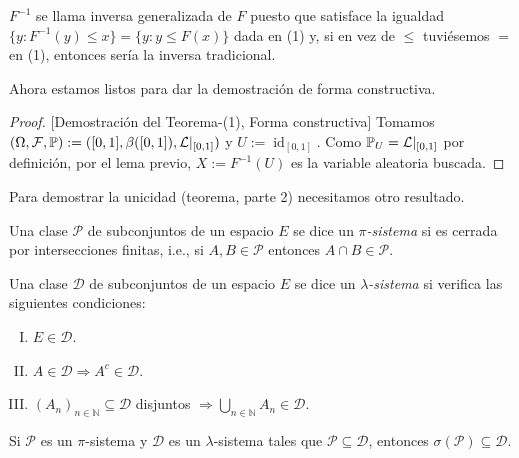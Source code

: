 \begin{remark}
	\(F^{-1}\) se llama inversa generalizada de \(F\) puesto que satisface la igualdad \(\{y : F^{-1}(y) \le x\} = \{y : y \le F(x)\}\) dada en (1) y, si en vez de \(\le\) tuviésemos \(=\) en (1), entonces sería la inversa tradicional.
\end{remark}

Ahora estamos listos para dar la demostración de forma constructiva.

\begin{proof}[Proof][Demostración del Teorema-(1), Forma constructiva]
	Tomamos \((\Omega, \mathcal{F}, \mathbb{P}) := ([0,1], \beta([0,1]), \mathcal{L}|_{[0,1]})\) y \(U := \operatorname{id}_{[0,1]}\). Como \(\mathbb{P}_U = \mathcal{L}|_{[0,1]}\) por definición, por el lema previo, \(X := F^{-1}(U)\) es la variable aleatoria buscada.
\end{proof}
\medskip \par
Para demostrar la unicidad (teorema, parte 2) necesitamos otro resultado.

\begin{definition}[\(\pi\)-sistema]
    Una clase \(\mathcal{P}\) de subconjuntos de un espacio \(E\) se dice un \textit{\(\pi\)-sistema} si es cerrada por intersecciones finitas, i.e., si \(A, B \in \mathcal{P}\) entonces \(A \cap B \in \mathcal{P}\).
\end{definition}

\begin{definition}
    Una clase \(\mathcal{D}\) de subconjuntos de un espacio \(E\) se dice un \textit{\(\lambda\)-sistema} si verifica las siguientes condiciones:
    \begin{enumerate}[I)]
        \item \(E \in \mathcal{D}\).
        \item \(A \in \mathcal{D} \Rightarrow A^c \in \mathcal{D}\).
        \item \((A_n)_{n\in\mathbb{N}} \subseteq \mathcal{D}\) disjuntos \(\Rightarrow \bigcup_{n\in\mathbb{N}} A_n \in \mathcal{D}\).
    \end{enumerate}
\end{definition}

\begin{theorem}
    Si \(\mathcal{P}\) es un \(\pi\)-sistema y \(\mathcal{D}\) es un \(\lambda\)-sistema tales que \(\mathcal{P} \subseteq \mathcal{D}\), entonces \(\sigma(\mathcal{P}) \subseteq \mathcal{D}\).
\end{theorem}


